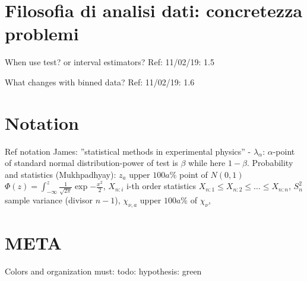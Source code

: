 \section{Filosofia di analisi dati: concretezza problemi}

\begin{frame}{When use test? or interval estimators?}\frameintoc
Ref: 11/02/19: 1.5
\end{frame}

\begin{frame}{What changes with binned data?}
Ref: 11/02/19: 1.6
\end{frame}

\section{Notation}

\begin{frame}{Ref notation}
 James: ''statistical methods in experimental physics'' - $\lambda_{\alpha}$: $\alpha$-point of standard normal distribution-power of test is $\beta$ while here $1-\beta$.
Probability and statistics (Mukhpadhyay): $z_a$ upper $100a\%$ point of $N(0,1)$ $\Phi(z)=\int_{-\infty}^z\frac{1}{\sqrt{2\pi}}\exp{-\frac{x^2}{2}}$, $X_{n:i}$ i-th order statistics $X_{n:1}\leq X_{n:2}\leq\ldots\leq X_{n:n}$, $S_n^2$ sample variance (divisor $n-1$), $\chi_{\nu,a}$ upper $100a\%$ of $\chi_{\nu}$, 
\end{frame}

\section{META}

\begin{frame}{Colors and organization}
must:
todo:
hypothesis: green
\end{frame}